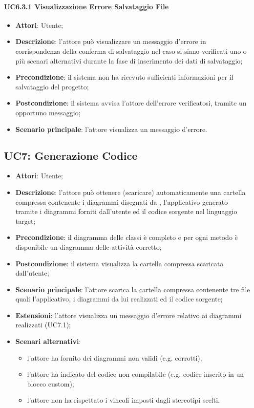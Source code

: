 \paragraph{UC6.3.1 Visualizzazione Errore Salvataggio File}
\begin{itemize}
	\item \textbf{Attori}: Utente;
	\item \textbf{Descrizione}: l'attore può visualizzare un messaggio d'errore in corrispondenza della conferma di salvataggio nel caso si siano verificati uno o più scenari alternativi durante la fase di inserimento dei dati di salvataggio;
	\item \textbf{Precondizione}: il sistema non ha ricevuto sufficienti informazioni per il salvataggio del progetto;
	\item \textbf{Postcondizione}: il sistema avvisa l'attore dell'errore verificatosi, tramite un opportuno messaggio;
	\item \textbf{Scenario principale}: l'attore visualizza un messaggio d'errore.
\end{itemize}

\subsection{UC7: Generazione Codice}
\label{UC7}
\begin{itemize}
	\item \textbf{Attori}: Utente;
	\item \textbf{Descrizione}: l'attore può ottenere (scaricare) automaticamente una cartella compressa contenente i diagrammi disegnati da \proj{}, l'applicativo generato tramite i diagrammi forniti dall'utente ed il codice sorgente nel linguaggio target;
	\item \textbf{Precondizione}: il diagramma delle classi è completo e per ogni metodo è disponibile un diagramma delle attività corretto;
	\item \textbf{Postcondizione}: il sistema visualizza la cartella compressa scaricata dall'utente;
	\item \textbf{Scenario principale}: l'attore scarica la cartella compressa contenente tre file quali l'applicativo, i diagrammi da lui realizzati ed il codice sorgente;
	\item \textbf{Estensioni}: l'attore visualizza un messaggio d'errore relativo ai diagrammi realizzati (UC7.1);
	\item \textbf{Scenari alternativi}:
	\begin{itemize}
	  \item l'attore ha fornito dei diagrammi non validi (e.g. corrotti);
		\item l'attore ha indicato del codice non compilabile (e.g. codice inserito in un blocco custom);
		\item l'attore non ha rispettato i vincoli imposti dagli stereotipi scelti.
	\end{itemize}
\end{itemize}

